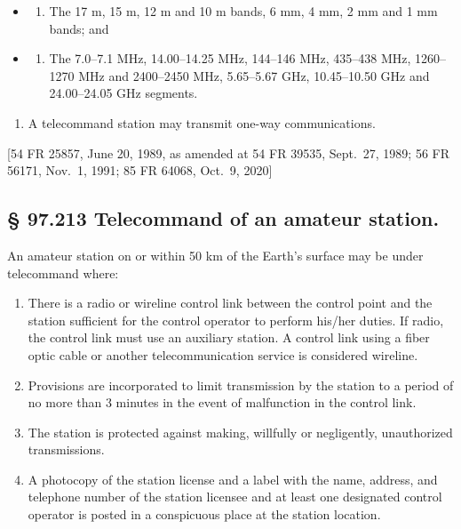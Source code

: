 \documentclass[
  letterpaper,
  DIV=11,
  numbers=noendperiod]{scrreport}
\providecommand{\tightlist}{%
  \setlength{\itemsep}{0pt}\setlength{\parskip}{0pt}}\usepackage{longtable,booktabs,array}
\begin{document}
\begin{itemize}
\item
  \begin{enumerate}
  \def\labelenumi{(\arabic{enumi})}
  \tightlist
  \item
    The 17 m, 15 m, 12 m and 10 m bands, 6 mm, 4 mm, 2 mm and 1 mm
    bands; and
  \end{enumerate}
\item
  \begin{enumerate}
  \def\labelenumi{(\arabic{enumi})}
  \setcounter{enumi}{1}
  \tightlist
  \item
    The 7.0--7.1 MHz, 14.00--14.25 MHz, 144--146 MHz, 435--438 MHz,
    1260--1270 MHz and 2400--2450 MHz, 5.65--5.67 GHz, 10.45--10.50 GHz
    and 24.00--24.05 GHz segments.
  \end{enumerate}
\end{itemize}

\begin{enumerate}
\def\labelenumi{(\alph{enumi})}
\setcounter{enumi}{3}
\tightlist
\item
  A telecommand station may transmit one-way communications.
\end{enumerate}

{[}54 FR 25857, June 20, 1989, as amended at 54 FR 39535, Sept.~27,
1989; 56 FR 56171, Nov.~1, 1991; 85 FR 64068, Oct.~9, 2020{]}

\hypertarget{telecommand-of-an-amateur-station.}{%
\subsection*{§ 97.213 Telecommand of an amateur
station.}\label{telecommand-of-an-amateur-station.}}

An amateur station on or within 50 km of the Earth's surface may be
under telecommand where:

\begin{enumerate}
\def\labelenumi{(\alph{enumi})}
\item
  There is a radio or wireline control link between the control point
  and the station sufficient for the control operator to perform his/her
  duties. If radio, the control link must use an auxiliary station. A
  control link using a fiber optic cable or another telecommunication
  service is considered wireline.
\item
  Provisions are incorporated to limit transmission by the station to a
  period of no more than 3 minutes in the event of malfunction in the
  control link.
\item
  The station is protected against making, willfully or negligently,
  unauthorized transmissions.
\item
  A photocopy of the station license and a label with the name, address,
  and telephone number of the station licensee and at least one
  designated control operator is posted in a conspicuous place at the
  station location.
\end{enumerate}
\end{document}
